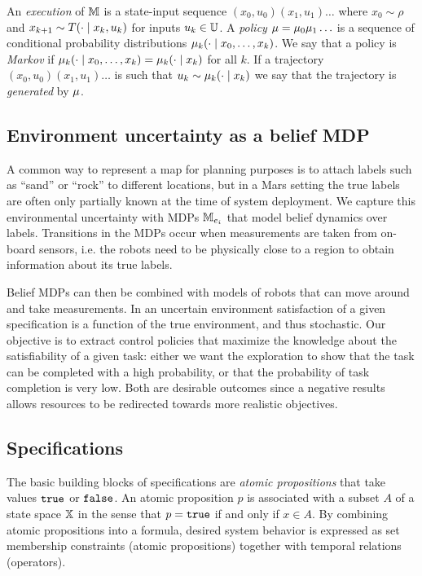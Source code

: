 \documentclass[draft,conference]{IEEEtran}
\begin{document}
An \emph{execution} of $\mathbb{M}$ is a state-input sequence $(x_0, u_0)(x_1, u_1)\ldots$ where $x_0 \sim \rho$ and $x_{k+1} \sim T(\cdot \mid x_k, u_k)$ for inputs $u_k \in \mathbb{U}$. A \emph{policy} $\mu = \mu_0 \mu_1 \ldots$ is a sequence of conditional probability distributions $\mu_k( \cdot \mid x_0, \ldots, x_{k})$. We say that a policy is \emph{Markov} if $\mu_k( \cdot \mid x_0, \ldots, x_{k}) = \mu_k( \cdot \mid x_{k})$ for all $k$. If a trajectory $(x_0, u_0)(x_1, u_1)\ldots$ is such that $u_k \sim \mu_k ( \cdot \mid x_{k})$ we say that the trajectory is \emph{generated} by $\mu$.


\subsection{Environment uncertainty as a belief MDP}

A common way to represent a map for planning purposes is to attach labels such as ``sand'' or ``rock'' to different locations, but in a Mars setting the true labels are often only partially known at the time of system deployment. We capture this environmental uncertainty with MDPs $\mathbb{M}_{e_i}$ that model belief dynamics over labels. Transitions in the MDPs occur when measurements are taken from on-board sensors, i.e. the robots need to be physically close to a region to obtain information about its true labels. 


Belief MDPs can then be combined with models of robots that can move around and take measurements. In an uncertain environment satisfaction of a given specification is a function of the true environment, and thus stochastic. Our objective is to extract control policies that maximize the knowledge about the satisfiability of a given task: either we want the exploration to show that the task can be completed with a high probability, or that the probability of task completion is very low. Both are desirable outcomes since a negative results allows resources to be redirected towards more realistic objectives.  

\subsection{Specifications}

The basic building blocks of specifications are \emph{atomic propositions} that take values $\texttt{true}$ or $\texttt{false}$. An atomic proposition $p$ is associated with a subset $A$ of a state space $\mathbb{X}$ in the sense that $p = \texttt{true}$ if and only if $x \in A$. By combining atomic propositions into a formula, desired system behavior is expressed as set membership constraints (atomic propositions) together with temporal relations (operators).
\end{document}
